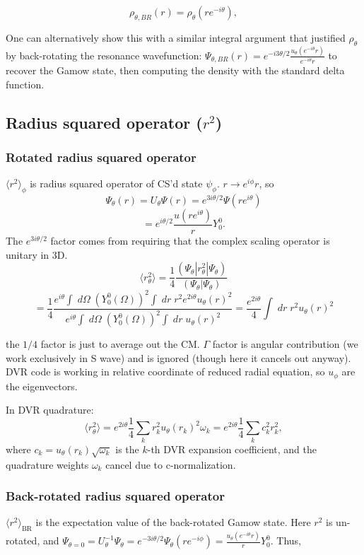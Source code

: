 $$
\rho_{\theta, BR}(r) = \rho_\theta(re^{-i\theta}),
$$

One can alternatively show this with a similar integral argument that justified $\rho_\theta$ by back-rotating the resonance wavefunction: $\Psi_{\theta,BR}(r) = e^{-i3\theta/2}\frac{u_\theta(e^{-i\theta}r)}{e^{-i\theta}r}$ to recover the Gamow state, then computing the density with the standard delta function.
\subsection{\texorpdfstring{Radius squared operator ($r^2$)}{Radius squared operator (r squared)}}
\subsubsection{Rotated radius squared operator}
$\langle r^2\rangle_\phi$ is radius squared operator of CS'd state $\psi_\phi$. $r\rightarrow e^{i\phi} r$, so
$$
\Psi_\theta(r) = U_\theta \Psi(r) = e^{3i\theta/2}\Psi(re^{i\theta})
$$
$$
= e^{i\theta/2}\frac{u(re^{i\theta})}{r}Y^0_0.
$$
The $e^{3i\theta/2}$ factor comes from requiring that the complex scaling operator is unitary in 3D.
$$
\langle r^2_\theta \rangle =\frac{1}{4}\frac{(\Psi_\theta|r^2_\theta|\Psi_\theta)}{(\Psi_\theta|\Psi_\theta)}
$$
$$
=\frac{1}{4}\frac{e^{i\theta}\int \;d\Omega\; (Y_0^0(\Omega))^2 \int\; dr \; r^2e^{2i\theta} u_\theta(r)^2}{e^{i\theta}\int \;d\Omega\; (Y^0_0(\Omega))^2\int\;dr \; u_\theta(r)^2} = \frac{e^{2i\theta}}{4} \int\;dr\; r^2 u_\theta(r)^2
$$

the $1/4$ factor is just to average out the CM. $\Gamma$ factor is angular contribution (we work exclusively in S wave) and is ignored (though here it cancels out anyway). DVR code is working in relative coordinate of reduced radial equation, so $u_\phi$ are the eigenvectors.

In DVR quadrature:
$$
\langle r^2_\theta\rangle = e^{2i\theta}\frac{1}{4}\sum_k r_k^2 u_\theta(r_k)^2 \omega_k = e^{2i\theta} \frac{1}{4} \sum_k c_k^2 r_k^2,
$$
where $c_k=u_\theta(r_k)\sqrt{\omega_k}$ is the $k$-th DVR expansion coefficient, and the quadrature weights $\omega_k$ cancel due to c-normalization.

\subsubsection{Back-rotated radius squared operator}
$\langle r^2 \rangle_{\text{BR}}$ is the expectation value of the back-rotated Gamow state. Here $r^2$ is un-rotated, and $\Psi_{\theta=0}=U_\theta^{-1}\Psi_{\theta}=e^{-3i\theta/2}\Psi_{\theta}(re^{-i\phi}) =\frac{u_\theta(e^{-i\theta} r)}{r}Y^0_0$. Thus,

